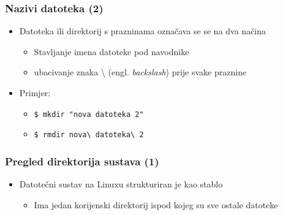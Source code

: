 \documentclass{beamer}
\begin{document}
\begin{frame}[t]
\frametitle{Nazivi datoteka (2)}
\begin{itemize}
  \item Datoteka ili direktorij s prazninama označava se se na dva načina
  \begin{itemize}
    \item Stavljanje imena datoteke pod navodnike
    \item ubacivanje znaka \textbackslash{} (engl. \emph{backslash})
          prije svake praznine
  \end{itemize}
  \item Primjer:
  \begin{itemize}
    \item[] \texttt{\$ mkdir "nova datoteka 2"}
    \item[] \texttt{\$ rmdir nova\textbackslash{} datoteka\textbackslash{}
                     2}
  \end{itemize}
\end{itemize}
\end{frame}

\begin{frame}[t]
\frametitle{Pregled direktorija sustava (1)}
\begin{itemize}
  \item Datotečni sustav na Linuxu strukturiran je kao stablo
  \begin{itemize}
    \item Ima jedan korijenski direktorij ispod kojeg su sve ostale
          datoteke
  \end{itemize}
  \begin{flushleft}
\end{flushleft}


\end{itemize}
\end{frame}
\end{document}
